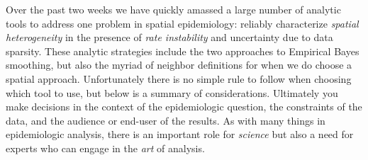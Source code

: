 \documentclass[
]{book}
\begin{document}
Over the past two weeks we have quickly amassed a large number of analytic tools to address one problem in spatial epidemiology: reliably characterize \emph{spatial heterogeneity} in the presence of \emph{rate instability} and uncertainty due to data sparsity. These analytic strategies include the two approaches to Empirical Bayes smoothing, but also the myriad of neighbor definitions for when we do choose a spatial approach. Unfortunately there is no simple rule to follow when choosing which tool to use, but below is a summary of considerations. Ultimately you make decisions in the context of the epidemiologic question, the constraints of the data, and the audience or end-user of the results. As with many things in epidemiologic analysis, there is an important role for \emph{science} but also a need for experts who can engage in the \emph{art} of analysis.
\end{document}
